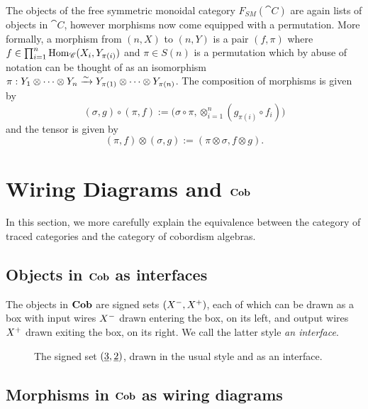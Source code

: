 \documentclass[12pt,oneside,article,draft]{memoir}
\begin{document}
The objects of the free symmetric monoidal category $F_{SM}(\cat{C})$ are again lists of objects in $\cat{C}$, however morphisms now come equipped with a permutation.  More formally, a morphism from $(n,X)$ to $(n,Y)$ is a pair $(f,\pi)$ where $f\in\prod_{i=1}^n\operatorname{Hom}_{\mathscr{C}}(X_i,Y_{\pi(i)})$ and $\pi\in S(n)$ is a permutation which by abuse of notation can be thought of as an isomorphism $\pi:Y_1\otimes\cdots\otimes Y_n\xrightarrow{\sim} Y_{\pi(1)}\otimes\cdots\otimes Y_{\pi(n)}$.  The composition of morphisms is given by 
$$(\sigma,g)\circ(\pi,f):=\Big(\sigma\circ\pi,\otimes_{i=1}^n (g_{\pi(i)}\circ f_i)\Big)$$ 
and the tensor is given by 
$$(\pi,f)\otimes(\sigma,g):=(\pi\otimes\sigma,f\otimes g).$$  

\section{Wiring Diagrams and $\mathbf{Cob}$}\label{sec:wds and cob}

In this section, we more carefully explain the equivalence between the category of traced categories and the category of cobordism algebras.

\subsection{Objects in $\mathbf{Cob}$ as interfaces}

The objects in $\mathbf{Cob}$ are signed sets $(X^-,X^+)$, each of which can be drawn as a box with input wires $X^-$ drawn entering the box, on its left, and output wires $X^+$ drawn exiting the box, on its right. We call the latter style \emph{an interface}.

\begin{figure}
\caption{The signed set $(\underline{3},\underline{2})$, drawn in the usual style and as an interface.}
\end{figure}

\subsection{Morphisms in $\mathbf{Cob}$ as wiring diagrams}
\end{document}
